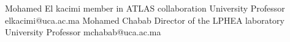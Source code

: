 %
%
%


\begin{referees}
		{Mohamed El kacimi}
		{member in ATLAS collaboration}
		{University Professor}
		{elkacimi@uca.ac.ma}
		{}
		{Mohamed Chabab}
		{Director of the LPHEA laboratory}
		{University Professor}
		{mchabab@uca.ac.ma}
		{}
\end{referees}

